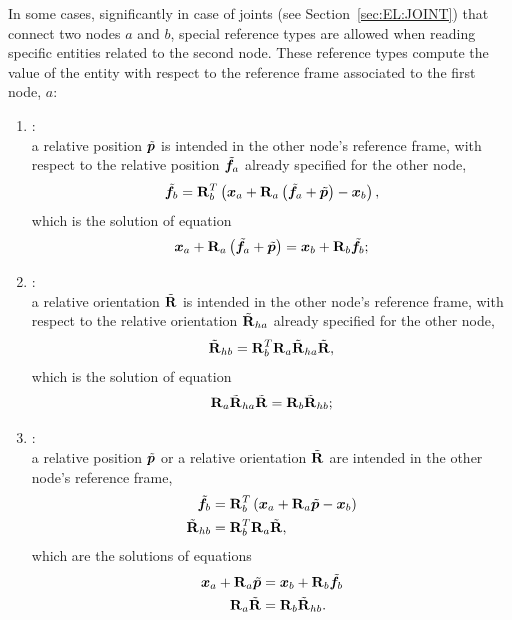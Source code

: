 In some cases, significantly in case of joints (see Section~\ref{sec:EL:JOINT}) that connect two nodes
$a$ and $b$, special reference types are allowed
when reading specific entities related to the second node.
These reference types compute the value of the entity with respect
to the reference frame associated to the first node, $a$:
\begin{enumerate}
\item {}: \\
	a relative position $\tilde{\boldsymbol{p}}$ is intended in the other node's
	reference frame, with respect to the relative position $\tilde{\boldsymbol{f}}_a$
	already specified for the other node,
\begin{equation}
	\tilde{\boldsymbol{f}}_b = \bm{\mathbf R}_b^T\left( 
		\boldsymbol{x}_a + \bm{\mathbf R}_a \left( 
			\tilde{\boldsymbol{f}}_a
			+ \tilde{\boldsymbol{p}}
		 \right)
		- \boldsymbol{x}_b
	 \right) ,
\end{equation}
	which is the solution of equation
\begin{equation}
	\boldsymbol{x}_a + \bm{\mathbf R}_a \left( \tilde{\boldsymbol{f}}_a + \tilde{\boldsymbol{p}} \right)
	= \boldsymbol{x}_b + \bm{\mathbf R}_b \tilde{\boldsymbol{f}}_b ;
\end{equation}

\item {}: \\
	a relative orientation $\tilde{\bm{\mathbf R}} $ is intended in the other node's
	reference frame, with respect to the relative orientation
	$\tilde{\bm{\mathbf R}}_{ha}$ already specified for the other node,
\begin{equation}
	\tilde{\bm{\mathbf R}}_{hb} = \bm{\mathbf R}_b^T \bm{\mathbf R}_a \tilde{\bm{\mathbf R}}_{ha} \tilde{\bm{\mathbf R}} ,
\end{equation}
	which is the solution of equation
\begin{equation}
	\bm{\mathbf R}_a \tilde{\bm{\mathbf R}}_{ha} \tilde{\bm{\mathbf R}}
	= \bm{\mathbf R}_b \tilde{\bm{\mathbf R}}_{hb} ;
\end{equation}

\item {}: \\
	a relative position $\tilde{\boldsymbol{p}}$
	or a relative orientation $\tilde{\bm{\mathbf R}}$
	are intended in the other node's reference frame,
\begin{subequations}
\begin{align}
	\tilde{\boldsymbol{f}}_b &= \bm{\mathbf R}_b^T\left( 
		\boldsymbol{x}_a + \bm{\mathbf R}_a \tilde{\boldsymbol{p}}
		- \boldsymbol{x}_b
	 \right) \\
	\tilde{\bm{\mathbf R}}_{hb} &= \bm{\mathbf R}_b^T \bm{\mathbf R}_a \tilde{\bm{\mathbf R}} ,
\end{align}
\end{subequations}
	which are the solutions of equations
\begin{subequations}
\begin{align}
	\boldsymbol{x}_a + \bm{\mathbf R}_a \tilde{\boldsymbol{p}}
	&= \boldsymbol{x}_b + \bm{\mathbf R}_b \tilde{\boldsymbol{f}}_b \\
	\bm{\mathbf R}_a \tilde{\bm{\mathbf R}}
	&= \bm{\mathbf R}_b \tilde{\bm{\mathbf R}}_{hb} .
\end{align}
\end{subequations}
\end{enumerate}

